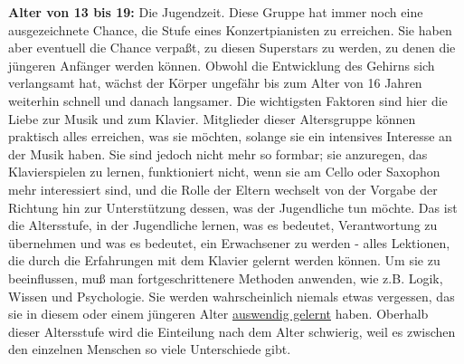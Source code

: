 \textbf{Alter von 13 bis 19:} Die Jugendzeit.
Diese Gruppe hat immer noch eine ausgezeichnete Chance, die Stufe eines Konzertpianisten zu erreichen.
Sie haben aber eventuell die Chance verpaßt, zu diesen Superstars zu werden, zu denen die jüngeren Anfänger werden können.
Obwohl die Entwicklung des Gehirns sich verlangsamt hat, wächst der Körper ungefähr bis zum Alter von 16 Jahren weiterhin schnell und danach langsamer.
Die wichtigsten Faktoren sind hier die Liebe zur Musik und zum Klavier.
Mitglieder dieser Altersgruppe können praktisch alles erreichen, was sie möchten, solange sie ein intensives Interesse an der Musik haben.
Sie sind jedoch nicht mehr so formbar; sie anzuregen, das Klavierspielen zu lernen, funktioniert  nicht, wenn sie am Cello oder Saxophon mehr interessiert sind, und die Rolle der Eltern wechselt von der Vorgabe der Richtung hin zur Unterstützung dessen, was der Jugendliche tun möchte.
Das ist die Altersstufe, in der Jugendliche lernen, was es bedeutet, Verantwortung zu übernehmen und was es bedeutet, ein Erwachsener zu werden - alles Lektionen, die durch die Erfahrungen mit dem Klavier gelernt werden können.
Um sie zu beeinflussen, muß man fortgeschrittenere Methoden anwenden, wie z.B. Logik, Wissen und Psychologie.
Sie werden wahrscheinlich niemals etwas vergessen, das sie in diesem oder einem jüngeren Alter \hyperref[c1iii6]{auswendig gelernt} haben.
Oberhalb dieser Altersstufe wird die Einteilung nach dem Alter schwierig, weil es zwischen den einzelnen Menschen so viele Unterschiede gibt.


\label{c1iii18c20}

